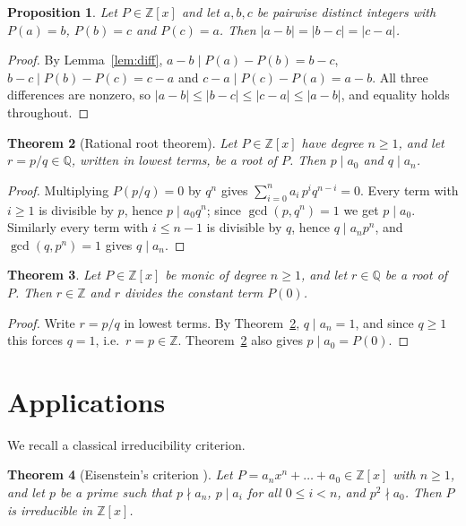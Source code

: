 \documentclass[11pt]{amsart}
\newtheorem{theorem}{Theorem}[section]
\newtheorem{proposition}[theorem]{Proposition}
\theoremstyle{definition}
\newcommand{\Z}{\mathbb{Z}}
\newcommand{\Q}{\mathbb{Q}}
\begin{document}
\begin{proposition}\label{prop:cycle}
Let $P\in\Z[x]$ and let $a,b,c$ be pairwise distinct integers with
$P(a)=b$, $P(b)=c$ and $P(c)=a$. Then $|a-b|=|b-c|=|c-a|$.
\end{proposition}

\begin{proof}
By Lemma~\ref{lem:diff}, $a-b\mid P(a)-P(b)=b-c$, $b-c\mid P(b)-P(c)=c-a$
and $c-a\mid P(c)-P(a)=a-b$. All three differences are nonzero, so
$|a-b|\leq|b-c|\leq|c-a|\leq|a-b|$, and equality holds throughout.
\end{proof}

\begin{theorem}[Rational root theorem]\label{thm:rrt}
Let $P\in\Z[x]$ have degree $n\geq 1$, and let $r=p/q\in\Q$, written in
lowest terms, be a root of $P$. Then $p\mid a_0$ and $q\mid a_n$.
\end{theorem}

\begin{proof}
Multiplying $P(p/q)=0$ by $q^n$ gives
$\sum_{i=0}^{n}a_i\,p^{i}q^{n-i}=0$. Every term with $i\geq 1$ is divisible
by $p$, hence $p\mid a_0q^n$; since $\gcd(p,q^n)=1$ we get $p\mid a_0$.
Similarly every term with $i\leq n-1$ is divisible by $q$, hence
$q\mid a_np^n$, and $\gcd(q,p^n)=1$ gives $q\mid a_n$.
\end{proof}

\begin{theorem}\label{thm:main}
Let $P\in\Z[x]$ be monic of degree $n\geq 1$, and let $r\in\Q$ be a root of
$P$. Then $r\in\Z$ and $r$ divides the constant term $P(0)$.
\end{theorem}

\begin{proof}
Write $r=p/q$ in lowest terms. By Theorem~\ref{thm:rrt}, $q\mid a_n=1$, and
since $q\geq 1$ this forces $q=1$, i.e.\ $r=p\in\Z$. Theorem~\ref{thm:rrt}
also gives $p\mid a_0=P(0)$.
\end{proof}

\section{Applications}\label{sec:app}

We recall a classical irreducibility criterion.

\begin{theorem}[Eisenstein's criterion {\cite[Ch.~IV, Thm.~3.1]{Lang}}]
\label{thm:eis}
Let $P=a_nx^n+\dots+a_0\in\Z[x]$ with $n\geq 1$, and let $p$ be a prime
such that $p\nmid a_n$, $p\mid a_i$ for all $0\leq i<n$, and
$p^2\nmid a_0$. Then $P$ is irreducible in $\Z[x]$.
\end{theorem}
\end{document}
